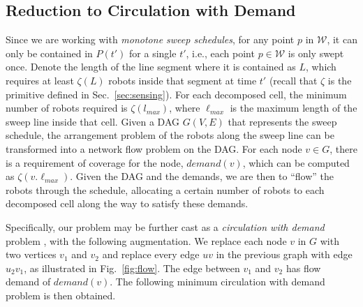 \subsection{Reduction to Circulation with Demand}
Since we are working with \emph{monotone sweep schedules}, for any point $p$ in 
$\mathcal W$, it can only be contained in $P(t')$ for a single $t'$, i.e., each 
point $p \in \mathcal W$ is only swept once. 
%
Denote the length of the line segment where it is contained as $L$, which 
requires at least $\zeta(L)$ robots inside that segment at time $t'$
(recall that $\zeta$ is the primitive defined in Sec.~\ref{sec:sensing}).
%
For each decomposed cell, the minimum number of robots required is $\zeta(l_{max})$, where $\ell_{max}$ 
is the maximum length of the sweep line inside that cell.
%
Given a DAG $G(V,E)$ that represents the sweep schedule, the arrangement problem of the robots along the sweep line can be transformed into a network 
flow problem on the DAG.
%
For each node $v\in G$, there is a requirement of coverage for the node, 
$demand(v)$, which can be computed as $\zeta(v.\ell_{max})$.
%
Given the DAG and the demands, we are then to ``flow'' the robots through 
the schedule, allocating a certain number of robots to each decomposed cell 
along the way to satisfy these demands. 
%

Specifically, our problem may be further cast as a \emph{circulation with demand} 
problem \cite{kleinberg2006algorithm}, with the following augmentation. We replace 
each node $v$ in $G$ with two vertices $v_1$ and $v_2$ and replace every edge 
$uv$ in the previous graph with edge $u_2 v_1$, as illustrated in Fig.~\ref{fig:flow}. 
The edge between $v_1$ and $v_2$ has flow demand of $demand(v)$. 
The following minimum circulation with demand problem is then obtained.

